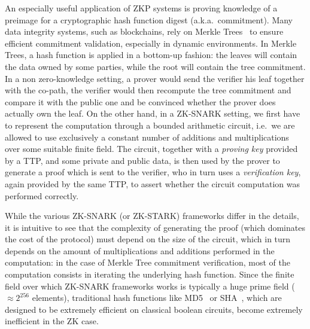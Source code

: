 An especially useful application of ZKP systems is proving knowledge of a preimage 
for a cryptographic hash function digest (a.k.a.\ commitment).
Many data integrity systems, such as blockchains, rely on Merkle Trees~\cite{Merkle1979} to 
ensure efficient commitment validation, especially in dynamic environments. 
In Merkle Trees, a hash function is applied in a bottom-up fashion: the leaves will contain the 
data owned by some parties, while the root will contain the tree commitment.
In a non zero-knowledge setting, a prover would send the verifier his leaf together with the co-path, 
the verifier would then recompute the tree commitment and compare it with the public one and be 
convinced whether the prover does actually own the leaf. 
On the other hand, in a ZK-SNARK setting, we first have to represent the computation through a 
bounded arithmetic circuit, i.e.\ we are allowed to use exclusively a constant number of additions 
and multiplications over some suitable finite field.
The circuit, together with a \emph{proving key} provided by a TTP, and some private and public data, 
is then used by the prover to generate a proof which is sent to the verifier, who in turn uses a 
\emph{verification key}, again provided by the same TTP, to assert whether the circuit computation
was performed correctly. 

While the various ZK-SNARK (or ZK-STARK) frameworks differ in the details, it is intuitive to see
that the complexity of generating the proof (which dominates the cost of the protocol) must depend 
on the size of the circuit, which in turn depends on the amount of multiplications and additions 
performed in the computation: in the case of Merkle Tree commitment verification, most of the 
computation consists in iterating the underlying hash function. 
Since the finite field over which ZK-SNARK frameworks works is typically a huge prime field 
(\(\approx 2^{256}\) elements), traditional hash functions like MD5~\cite{Rivest1990} or 
SHA~\cite{Dang2015}, which are designed to be extremely efficient on classical boolean circuits, 
become extremely inefficient in the ZK case.

